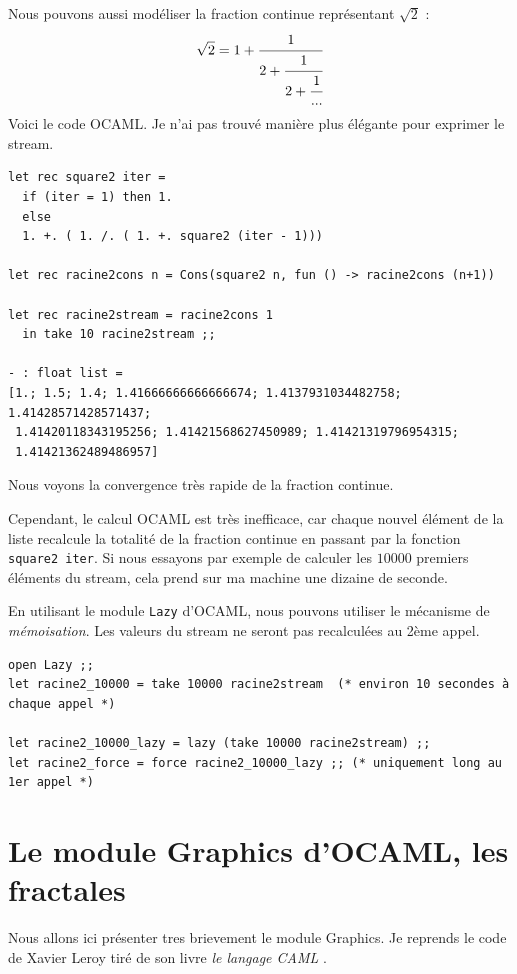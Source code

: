 \documentclass[11pt]{book}
\begin{document}
Nous pouvons aussi modéliser la fraction continue représentant $\sqrt{2}$ :
\begin{equation*}
\sqrt{2} = 1 + \cfrac{1}{2
+ \cfrac{1}{2
+ \cfrac{1}{...
 } } }
\end{equation*}
Voici le code OCAML. Je n'ai pas trouvé manière plus élégante pour exprimer le stream.
\begin{Verbatim}
let rec square2 iter =
  if (iter = 1) then 1.
  else
  1. +. ( 1. /. ( 1. +. square2 (iter - 1)))

let rec racine2cons n = Cons(square2 n, fun () -> racine2cons (n+1))

let rec racine2stream = racine2cons 1
  in take 10 racine2stream ;;

- : float list =
[1.; 1.5; 1.4; 1.41666666666666674; 1.4137931034482758; 1.41428571428571437;
 1.41420118343195256; 1.41421568627450989; 1.41421319796954315;
 1.41421362489486957]
\end{Verbatim}
Nous voyons la convergence très rapide de la fraction continue.

Cependant, le calcul OCAML est très inefficace, car chaque nouvel élément de la liste recalcule la totalité de la fraction continue
en passant par la fonction \verb+square2 iter+. Si nous essayons par exemple de calculer les $10000$ premiers éléments du stream, cela prend sur ma machine une
dizaine de seconde. 

En utilisant le module \verb+Lazy+ d'OCAML, nous pouvons utiliser le mécanisme de \textit{mémoisation}. Les valeurs du stream ne seront pas recalculées au 
2ème appel.
\begin{Verbatim}
open Lazy ;;
let racine2_10000 = take 10000 racine2stream  (* environ 10 secondes à chaque appel *)

let racine2_10000_lazy = lazy (take 10000 racine2stream) ;;
let racine2_force = force racine2_10000_lazy ;; (* uniquement long au 1er appel *)
\end{Verbatim} 



\section{Le module Graphics d'OCAML, les fractales}

Nous allons ici présenter tres brievement le module Graphics.
Je reprends le code de Xavier Leroy tiré de son livre \textit{le langage CAML} \cite{caml}.
\end{document}
